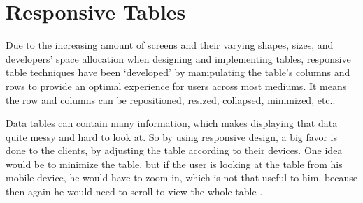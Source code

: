 %
%
%
%
%
\chapter{Responsive Tables}

Due to the increasing amount of screens and their varying shapes,
sizes, and developers' space allocation when designing and
implementing tables, responsive table techniques have been `developed'
by manipulating the table's columns and rows to provide an optimal
experience for users across most mediums. It means the row and columns
can be repositioned, resized, collapsed, minimized, etc..

Data tables can contain many information, which makes displaying that
data quite messy and hard to look at. So by using responsive design, a
big favor is done to the clients, by adjusting the table according to
their devices. One idea would be to minimize the table, but if the
user is looking at the table from his mobile device, he would have to
zoom in, which is not that useful to him, because then again he would
need to scroll
to view the whole table \parencite{Alligator}.

